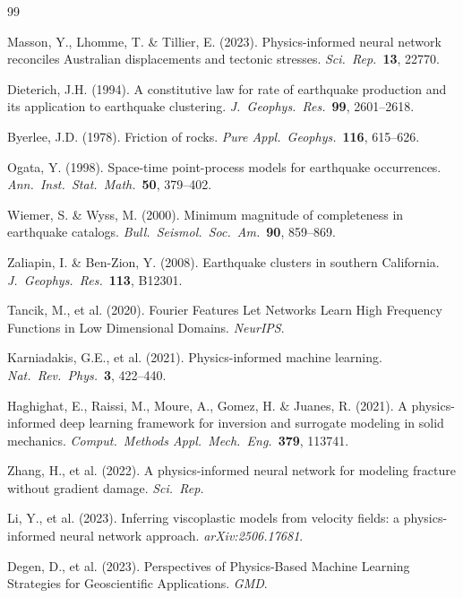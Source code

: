 \documentclass[11pt, a4paper]{article}
\begin{document}
\begin{thebibliography}{99}

Masson, Y., Lhomme, T. \& Tillier, E. (2023). Physics-informed neural network reconciles Australian displacements and tectonic stresses. \textit{Sci.\ Rep.}\ \textbf{13}, 22770.

Dieterich, J.H. (1994). A constitutive law for rate of earthquake production and its application to earthquake clustering. \textit{J.\ Geophys.\ Res.}\ \textbf{99}, 2601--2618.

Byerlee, J.D. (1978). Friction of rocks. \textit{Pure Appl.\ Geophys.}\ \textbf{116}, 615--626.

Ogata, Y. (1998). Space-time point-process models for earthquake occurrences. \textit{Ann.\ Inst.\ Stat.\ Math.}\ \textbf{50}, 379--402.

Wiemer, S. \& Wyss, M. (2000). Minimum magnitude of completeness in earthquake catalogs. \textit{Bull.\ Seismol.\ Soc.\ Am.}\ \textbf{90}, 859--869.

Zaliapin, I. \& Ben-Zion, Y. (2008). Earthquake clusters in southern California. \textit{J.\ Geophys.\ Res.}\ \textbf{113}, B12301.

Tancik, M., et al. (2020). Fourier Features Let Networks Learn High Frequency Functions in Low Dimensional Domains. \textit{NeurIPS}.

Karniadakis, G.E., et al. (2021). Physics-informed machine learning. \textit{Nat.\ Rev.\ Phys.}\ \textbf{3}, 422--440.

Haghighat, E., Raissi, M., Moure, A., Gomez, H. \& Juanes, R. (2021). A physics-informed deep learning framework for inversion and surrogate modeling in solid mechanics. \textit{Comput.\ Methods Appl.\ Mech.\ Eng.}\ \textbf{379}, 113741.

Zhang, H., et al. (2022). A physics-informed neural network for modeling fracture without gradient damage. \textit{Sci.\ Rep.}

Li, Y., et al. (2023). Inferring viscoplastic models from velocity fields: a physics-informed neural network approach. \textit{arXiv:2506.17681}.

Degen, D., et al. (2023). Perspectives of Physics-Based Machine Learning Strategies for Geoscientific Applications. \textit{GMD}.


\end{thebibliography}
\end{document}
